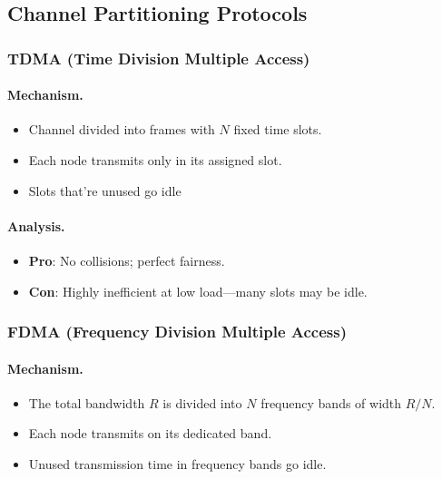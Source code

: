 \documentclass[12pt]{article}
\begin{document}
\subsection{Channel Partitioning Protocols}

\subsubsection{TDMA (Time Division Multiple Access)}

\paragraph{Mechanism.}
\begin{itemize}
    \item Channel divided into frames with $N$ fixed time slots.
    \item Each node transmits only in its assigned slot.
    \item Slots that're unused go idle
\end{itemize}

\paragraph{Analysis.}
\begin{itemize}
    \item \textbf{Pro}: No collisions; perfect fairness.
    \item \textbf{Con}: Highly inefficient at low load—many slots may be idle.
\end{itemize}

\subsubsection{FDMA (Frequency Division Multiple Access)}

\paragraph{Mechanism.}
\begin{itemize}
    \item The total bandwidth $R$ is divided into $N$ frequency bands of width $R/N$.
    \item Each node transmits on its dedicated band.
    \item Unused transmission time in frequency bands go idle.
\end{itemize}
\end{document}
